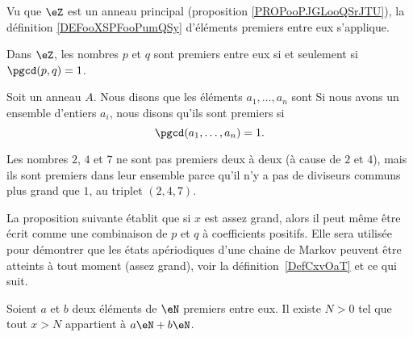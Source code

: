 Vu que \( \eZ\) est un anneau principal (proposition \ref{PROPooPJGLooQSrJTU}), la définition \ref{DEFooXSPFooPumQSy} d'éléments premiers entre eux s'applique.

\begin{lemma}       \label{LEMooLKLTooXUdsgB}
	Dans \( \eZ\), les nombres \( p\) et \( q\) sont premiers entre eux si et seulement si \( \pgcd(p,q)=1\).
\end{lemma}

\begin{definition}  \label{DefZHRXooNeWIcB}
	Soit un anneau \( A\). Nous disons que les éléments \( a_1,\ldots,a_n\) sont
	Si nous avons un ensemble d'entiers \( a_i\), nous disons qu'ils sont premiers  si
	\begin{equation}
		\pgcd(a_1,\ldots,a_n)=1.
	\end{equation}
\end{definition}

Les nombres \( 2\), \( 4\) et \( 7\) ne sont pas premiers deux à deux (à cause de \( 2\) et \( 4\)), mais ils sont premiers dans leur ensemble parce qu'il n'y a pas de diviseurs communs plus grand que \( 1\), au triplet \( (2, 4, 7)\).

La proposition suivante établit que si \( x\) est assez grand, alors il peut même être écrit comme une combinaison de \( p\) et \( q\) à coefficients positifs. Elle sera utilisée pour démontrer que les états apériodiques d'une chaine de Markov peuvent être atteints à tout moment (assez grand), voir la définition~\ref{DefCxvOaT} et ce qui suit.

\begin{proposition}     \label{PropLAbRSE}
	Soient \( a\) et \( b\) deux éléments de \( \eN\) premiers entre eux. Il existe \( N>0\) tel que tout \( x>N\) appartient à \( a\eN+b\eN\).
\end{proposition}

